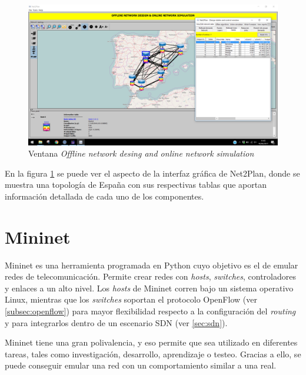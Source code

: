 \begin{figure}[ht!]
	\centering
	\includegraphics[width=1\linewidth]{imagenes/n2p_redes}
	\caption{Ventana \textit{Offline network desing and online network simulation}}
	\label{fig:n2p_redes}
\end{figure}

En la figura \ref{fig:n2p_redes} se puede ver el aspecto de la interfaz gráfica de Net2Plan, donde se muestra una topología de España con sus respectivas tablas que aportan información detallada de cada uno de los componentes.

\section{Mininet}
\label{sec:mininet}

Mininet\cite{mininetbib} es una herramienta programada en Python cuyo objetivo es el de emular redes de telecomunicación. Permite crear redes con \textit{hosts}, \textit{switches}, controladores y enlaces a un alto nivel. Los \textit{hosts} de Mininet corren bajo un sistema operativo Linux, mientras que los \textit{switches} soportan el protocolo OpenFlow (ver \ref{subsec:openflow}) para mayor flexibilidad respecto a la configuración del \textit{routing} y para integrarlos dentro de un escenario SDN (ver \ref{sec:sdn}).

Mininet tiene una gran polivalencia, y eso permite que sea utilizado en diferentes tareas, tales como investigación, desarrollo, aprendizaje o testeo. Gracias a ello, se puede conseguir emular una red con un comportamiento similar a una real.

